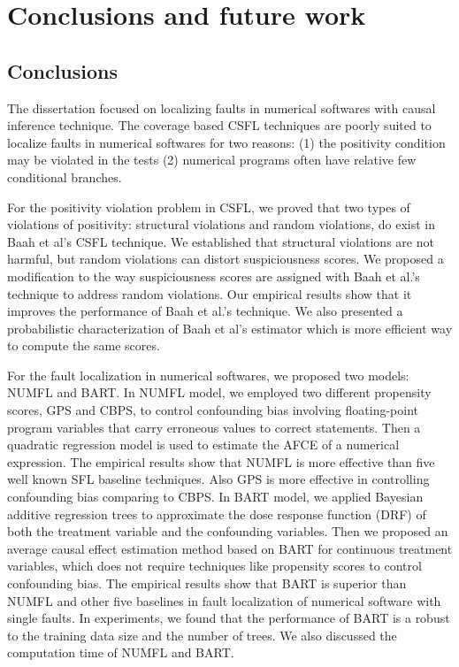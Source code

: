\chapter{Conclusions and future work}\label{conclusion}
\section{Conclusions}
The dissertation focused on localizing faults in numerical softwares with causal inference technique.  The coverage based CSFL techniques are  poorly suited to localize faults in numerical softwares for two reasons: (1) the positivity condition may be violated in the tests (2) numerical programs often have relative few conditional branches.

For the positivity violation problem in CSFL, we proved that two types of violations of positivity: structural violations and random violations, do exist in Baah et al’s CSFL technique. We established that structural violations are not harmful, but random violations can distort suspiciousness scores.  We proposed a modification to the way suspiciousness scores are assigned with Baah et al.’s technique to address random violations.  Our empirical results show that it improves the performance of Baah et al.’s technique. We also presented a probabilistic characterization of Baah et al’s estimator which is more efficient way to compute the same scores. 

For the fault localization in numerical softwares, we proposed two models: NUMFL and BART.  In NUMFL model, we employed two different propensity scores, GPS and CBPS, to control confounding bias involving floating-point program variables that carry erroneous values to correct statements.  Then a quadratic regression model is used to estimate the AFCE of a numerical expression. The empirical results show that NUMFL is more effective than five well known SFL baseline techniques. Also GPS is more effective in controlling confounding bias comparing to CBPS. In BART model, we applied Bayesian additive regression trees to approximate the dose response function (DRF) of both the treatment variable and the confounding variables. Then we proposed an average causal effect estimation method based on BART for continuous treatment variables, which does not require techniques like propensity scores to control confounding bias. The empirical results show that BART is superior than NUMFL and other five baselines in fault localization of numerical software with single faults. In experiments, we found that the performance of BART is a robust to the training data size and the number of trees. We also discussed the computation time of NUMFL and BART. 

